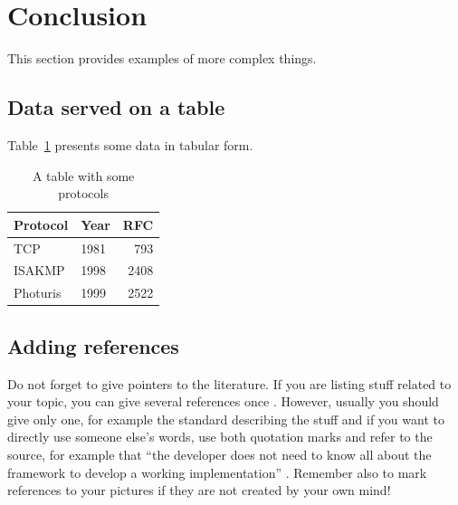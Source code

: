 \documentclass[article]{aaltoseries}
\begin{document}


\section{Conclusion}

This section provides examples of more complex things.




\subsection{Data served on a table}


Table~\ref{tab:mytable1} presents some data in tabular form. 

\begin{table}[t!]
  \begin{center}
    \begin{tabular}{|l|lr|}
    \hline
    Protocol & Year &  RFC \\
    \hline
    TCP      & 1981 &  793 \\
    ISAKMP   & 1998 & 2408 \\
    Photuris & 1999 & 2522 \\
    \hline
    \end{tabular}
    \caption{A table with some protocols}
    \label{tab:mytable1}
  \end{center}
\end{table}




\subsection{Adding references}
\label{sec:references}

Do not forget to give pointers to the literature. If you are listing
stuff related to your topic, you can give several references once
\cite{Com00,HTS03,Nik99}. However, usually you should give only one, for example the standard describing the stuff \cite{RFC2408} and if you want to directly use someone else's words, use both quotation marks and refer to the source, for example that ``the developer does not need to know all about the framework to develop a working implementation'' \cite{Suo98}. Remember also to mark references to your pictures if they are not created by your own mind!
\end{document}

